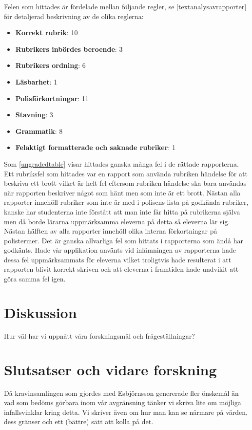 \documentclass[swedish]{maucsthesis}
\begin{document}
Felen som hittades är fördelade mellan följande regler, se \cref{textanalysavrapporter} för detaljerad beskrivning av
de olika reglerna:

\begin{itemize}
\item \textbf{Korrekt rubrik}:  10
\item \textbf{Rubrikers inbördes beroende}: 3
\item \textbf{Rubrikers ordning}: 6
\item \textbf{Läsbarhet}: 1
\item \textbf{Polisförkortningar}: 11
\item \textbf{Stavning}: 3
\item \textbf{Grammatik}: 8
\item \textbf{Felaktigt formatterade och saknade rubriker}: 1
\end{itemize}

Som \cref{ungradedtable} visar hittades ganska många fel i de rättade rapporterna. 
Ett rubriksfel som hittades var en rapport som använda rubriken händelse för att beskriva ett brott vilket
är helt fel eftersom rubriken händelse ska bara användas när rapporten beskriver något som hänt men som inte är ett brott.
Nästan alla rapporter innehöll rubriker som inte är med i polisens lista på godkända rubriker, kanske har studenterna
inte förstått att man inte får hitta på rubrikerna själva men då borde lärarna uppmärksamma eleverna på detta så
eleverna lär sig. Nästan hälften av alla rapporter innehöll olika interna förkortningar på polistermer.
Det är ganska allvarliga fel som hittats i rapporterna som ändå har godkänts. Hade vår applikation använts
vid inlämningen av rapporterna hade dessa fel uppmärksammats för eleverna vilket troligtvis hade resulterat
i att rapporten blivit korrekt skriven och att eleverna i framtiden hade undvikit att göra samma fel igen.


\section{Diskussion}
Hur väl har vi uppnått våra forskningsmål och frågeställningar?
\section{Slutsatser och vidare forskning}\label{slutsatserochvidareforskning}
Då kravinsamlingen som gjordes med Esbjörnsson genererade fler önskemål än
vad som bedöms görbara inom vår avgränsning tänker vi skriva lite om möjliga
infallsvinklar kring detta.
Vi skriver även om hur man kan se närmare på värden, dess gränser och ett (bättre) sätt att kolla på det.
\end{document}
